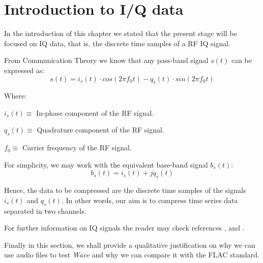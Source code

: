 \section{Introduction to I/Q data}

In the introduction of this chapter we stated that the present stage will be focused on IQ data, that is, the discrete time samples of a RF IQ signal.

From Communication Theory we know that any pass-band signal $s(t)$ can be expressed as:
\begin{equation}
s(t) = i_s(t) \cdot cos(2\pi f_0 t) - q_s(t) \cdot sin(2\pi f_0 t)
\end{equation}

Where:
\begin{description}
	\item $i_s(t) \equiv$ In-phase component of the RF signal.
	\item $q_s(t) \equiv$ Quadrature component of the RF signal.
	\item $f_0 \equiv$ Carrier frequency of the RF signal.
\end{description}

For simplicity, we may work with the equivalent base-band signal $b_s(t)$:
\begin{equation}
	b_s(t) = i_s(t) + j q_s(t)
\end{equation}


Hence, the data to be compressed are the discrete time samples of the signals $i_s(t)$ and $q_s(t)$. In other words, our aim is to compress time series data separated in two channels.

For further information on IQ signals the reader may check references \parencite{IQintro}, \parencite{carlson2010communication} and \parencite{ICOM}.

Finally in this section, we shall provide a qualitative justification on why we can use audio files to test \textit{Wave} and why we can compare it with the FLAC standard.

